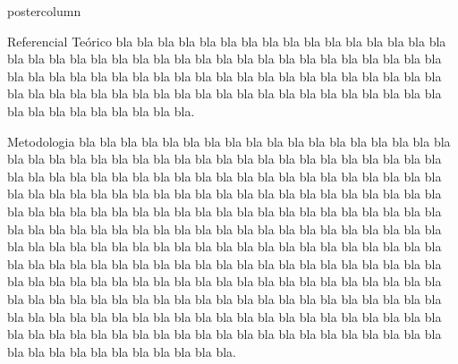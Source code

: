\documentclass{beamer}
\begin{document}
\begin{frame}
\begin{columns}
\begin{column}{.49 \textwidth}
\begin{beamercolorbox}[center, wd= \textwidth]{postercolumn}
\begin{minipage}[T]{.95 \textwidth}
{\begin{block}{{\Large Referencial Teórico}}
{bla bla bla bla bla bla bla bla bla bla bla bla bla bla bla bla bla bla bla bla bla bla bla bla bla bla bla bla bla bla bla bla bla bla bla bla bla bla bla bla bla bla bla bla bla bla bla bla bla bla bla bla bla bla bla bla bla bla bla bla bla bla bla bla bla bla bla bla bla bla bla bla bla bla bla bla bla bla 
bla bla bla bla bla bla bla bla bla bla.}
\end{block}
\vspace{2cm}
\begin{block}{{\Large Metodologia}}
\justifying
{\large
bla bla bla bla bla bla bla bla bla bla bla bla bla bla bla bla bla bla bla bla bla bla bla bla bla bla bla bla bla bla bla bla bla bla bla bla bla bla bla bla bla bla bla bla bla bla bla bla bla bla bla bla bla bla bla bla bla bla bla bla bla bla bla bla bla bla bla bla bla bla bla bla bla bla bla bla bla bla 
bla bla bla bla bla bla bla bla bla bla bla bla bla bla bla bla bla bla bla bla bla bla bla bla bla bla bla bla bla bla bla bla bla bla bla bla bla bla bla bla bla bla bla bla bla bla bla bla bla bla bla bla bla bla bla bla bla bla bla bla bla bla bla bla bla bla bla bla bla bla bla bla bla bla bla bla bla bla 
bla bla bla bla bla bla bla bla bla bla bla bla bla bla bla bla bla bla bla bla bla bla bla bla bla bla bla bla bla bla bla bla bla bla bla bla bla bla bla bla bla bla bla bla bla bla bla bla bla bla bla bla bla bla bla bla bla bla bla bla bla bla bla bla bla bla bla bla bla bla bla bla bla bla bla bla bla bla bla bla bla bla bla bla bla bla bla bla bla bla bla bla bla bla bla bla bla bla bla bla bla bla bla bla.}
\end{block}
\vfill
}
\end{minipage}
\end{beamercolorbox}
\end{column}


\end{columns}
\end{frame}
\end{document}
